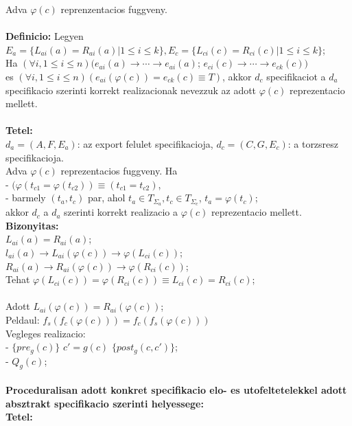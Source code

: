 \documentclass[a4paper,10pt]{article}
\begin{document}
Adva $\varphi(c)$ reprenzentacios fuggveny.\\ \\
\textbf{Definicio:} Legyen $E_a=\lbrace L_{ai}(a)=R_{ai}(a)\vert 1\le i\le k\rbrace, E_c=\lbrace L_{ci}(c)=R_{ci}(c)\vert 1\le i\le k\rbrace$;\\
Ha $(\forall i, 1\le i\le n)(e_{ai}(a)\to \cdots \to e_{ai}(a)$; $e_{ci}(c)\to \cdots \to e_{ck}(c))$\\
es $(\forall i, 1\le i\le n)(e_{ai}(\varphi(c))=e_{ck}(c)\equiv T)$, akkor $d_c$ specifikaciot a $d_a$ specifikacio szerinti korrekt realizacionak nevezzuk az adott $\varphi(c)$ reprezentacio mellett.\\ \\
\textbf{Tetel:}\\
$d_a=(A, F, E_a)$: az export felulet specifikacioja, $d_c=(C, G, E_c)$: a torzsresz specifikacioja.\\
Adva $\varphi(c)$ reprezentacios fuggveny. Ha\\
\indent - $(\varphi(t_{c1} = \varphi(t_{c2})) \equiv (t_{c1} = t_{c2})$,\\
\indent - barmely $(t_a, t_c)$ par, ahol $t_a \in T_{\Sigma_a}, t_c\in T_{\Sigma_c}$, $t_a=\varphi(t_c)$;\\
akkor $d_c$ a $d_a$ szerinti korrekt realizacio a $\varphi(c)$ reprezentacio mellett.\\
\textbf{Bizonyitas:}\\
$L_{ai}(a) = R_{ai}(a)$;\\
$l_{ai}(a) \to L_{ai}(\varphi(c)) \to \varphi(L_{ci}(c))$;\\
$R_{ai}(a) \to R_{ai}(\varphi(c)) \to \varphi(R_{ci}(c))$;\\
Tehat $\varphi(L_{ci}(c)) = \varphi(R_{ci}(c)) \equiv L_{ci}(c) = R_{ci}(c)$;\\ \\
Adott $L_{ai}(\varphi(c)) = R_{ai}(\varphi(c))$;\\
Peldaul: $f_s(f_c(\varphi(c))) = f_c(f_s(\varphi(c)))$\\
Vegleges realizacio:\\
- $\lbrace pre_g(c)\rbrace$ $c'=g(c)$ $\lbrace post_g(c,c')\rbrace$;\\
- $Q_g(c)$;\\ \\
\textbf{Proceduralisan adott konkret specifikacio elo- es utofeltetelekkel adott absztrakt specifikacio szerinti helyessege:}\\
\textbf{Tetel:}\\
\end{document}
